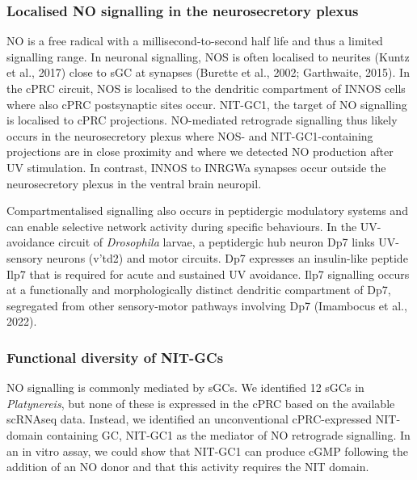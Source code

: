 \documentclass[
  11pt,
  letterpaper,
  DIV=11,
  numbers=noendperiod]{scrartcl}
\newcounter{none} %
\begin{document}
\subsubsection{Localised NO signalling in the neurosecretory
plexus}\label{localised-no-signalling-in-the-neurosecretory-plexus}

NO is a free radical with a millisecond-to-second half life and thus a
limited signalling range. In neuronal signalling, NOS is often localised
to neurites (Kuntz et al., 2017) close to sGC at synapses (Burette et
al., 2002; Garthwaite, 2015). In the cPRC circuit, NOS is localised to
the dendritic compartment of INNOS cells where also cPRC postsynaptic
sites occur. NIT-GC1, the target of NO signalling is localised to cPRC
projections. NO-mediated retrograde signalling thus likely occurs in the
neurosecretory plexus where NOS- and NIT-GC1-containing projections are
in close proximity and where we detected NO production after UV
stimulation. In contrast, INNOS to INRGWa synapses occur outside the
neurosecretory plexus in the ventral brain neuropil.

Compartmentalised signalling also occurs in peptidergic modulatory
systems and can enable selective network activity during specific
behaviours. In the UV-avoidance circuit of \emph{Drosophila} larvae, a
peptidergic hub neuron Dp7 links UV-sensory neurons (v'td2) and motor
circuits. Dp7 expresses an insulin-like peptide Ilp7 that is required
for acute and sustained UV avoidance. Ilp7 signalling occurs at a
functionally and morphologically distinct dendritic compartment of Dp7,
segregated from other sensory-motor pathways involving Dp7 (Imambocus et
al., 2022).

\subsubsection{Functional diversity of
NIT-GCs}\label{functional-diversity-of-nit-gcs}

NO signalling is commonly mediated by sGCs. We identified 12 sGCs in
\emph{Platynereis}, but none of these is expressed in the cPRC based on
the available scRNAseq data. Instead, we identified an unconventional
cPRC-expressed NIT-domain containing GC, NIT-GC1 as the mediator of NO
retrograde signalling. In an in vitro assay, we could show that NIT-GC1
can produce cGMP following the addition of an NO donor and that this
activity requires the NIT domain.
\end{document}
